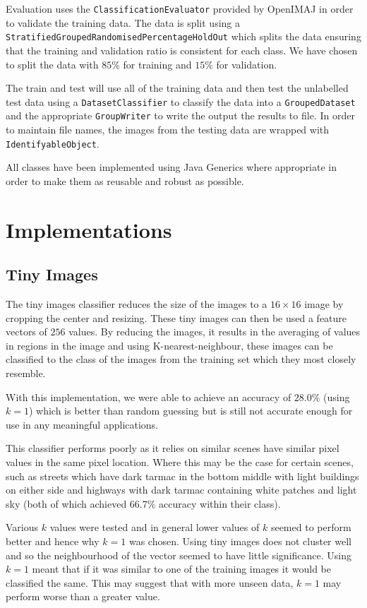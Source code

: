 \documentclass[paper=a4]{article}
\begin{document}
Evaluation uses the \texttt{ClassificationEvaluator} provided by OpenIMAJ in order to validate the training data. The data is split using a \texttt{StratifiedGroupedRandomisedPercentageHoldOut} which splits the data ensuring that the training and validation ratio is consistent for each class. We have chosen to split the data with $85\%$ for training and $15\%$ for validation.

The train and test will use all of the training data and then test the unlabelled test data using a \texttt{DatasetClassifier} to classify the data into a \texttt{GroupedDataset} and the appropriate \texttt{GroupWriter} to write the output the results to file. In order to maintain file names, the images from the testing data are wrapped with \texttt{IdentifyableObject}.

All classes have been implemented using Java Generics where appropriate in order to make them as reusable and robust as possible.

\section{Implementations}

\subsection{Tiny Images}

The tiny images classifier reduces the size of the images to a $16 \times 16$ image by cropping the center and resizing. These tiny images can then be used a feature vectors of $256$ values. By reducing the images, it results in the averaging of values in regions in the image and using K-nearest-neighbour, these images can be classified to the class of the images from the training set which they most closely resemble.

With this implementation, we were able to achieve an accuracy of $28.0\%$ (using $k=1$) which is better than random guessing but is still not accurate enough for use in any meaningful applications.

This classifier performs poorly as it relies on similar scenes have similar pixel values in the same pixel location. Where this may be the case for certain scenes, such as streets  which have dark tarmac in the bottom middle with light buildings on either side and highways with dark tarmac containing white patches and light sky (both of which achieved 66.7\% accuracy within their class).

Various $k$ values were tested and in general lower values of $k$ seemed to perform better and hence why $k=1$ was chosen. Using tiny images does not cluster well and so the neighbourhood of the vector seemed to have little significance. Using $k=1$ meant that if it was similar to one of the training images it would be classified the same. This may suggest that with more unseen data, $k=1$ may perform worse than a greater value.
\end{document}
